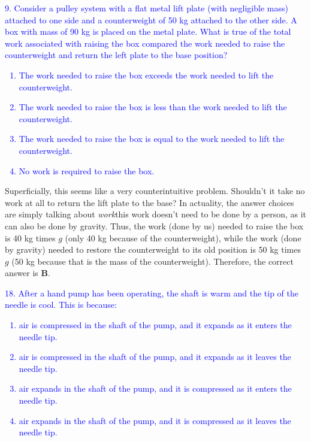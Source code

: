 \documentclass{article}
\theoremstyle{plain}%
\theoremstyle{definition}
\theoremstyle{remark}
\begin{document}
\begin{center}
\begin{minipage}{30em}
\textcolor{blue}{9. Consider a pulley system with a flat metal lift plate (with negligible mass) attached to one side and a counterweight of 50 kg attached to the other side. A box with mass of 90 kg is placed on the metal plate. What is true of the total work associated with raising the box compared the work needed to raise the counterweight and return the left plate to the base position?
\begin{enumerate}[label=\Alph*]
	\item The work needed to raise the box exceeds the work needed to lift the counterweight.
	\item The work needed to raise the box is less than the work needed to lift the counterweight.
	\item The work needed to raise the box is equal to the work needed to lift the counterweight.
	\item No work is required to raise the box.
\end{enumerate}}
\end{minipage}
\end{center}
\indent Superficially, this seems like a very counterintuitive problem. Shouldn't it take no work at all to return the lift plate to the base? In actuality, the answer choices are simply talking about \textit{work}\textemdash this work doesn't need to be done by a person, as it can also be done by gravity. Thus, the work (done by us) needed to raise the box is 40 kg times $g$ (only 40 kg because of the counterweight), while the work (done by gravity) needed to restore the counterweight to its old position is 50 kg times $g$ (50 kg because that is the mass of the counterweight). Therefore, the correct answer is \textbf{B}.
\begin{center}
\begin{minipage}{30em}
\textcolor{blue}{18. After a hand pump has been operating, the shaft is warm and the tip of the needle is cool. This is because:
\begin{enumerate}[label=\Alph*]
	\item air is compressed in the shaft of the pump, and it expands as it enters the needle tip.
	\item air is compressed in the shaft of the pump, and it expands as it leaves the needle tip.
	\item air expands in the shaft of the pump, and it is compressed as it enters the needle tip.
	\item air expands in the shaft of the pump, and it is compressed as it leaves the needle tip.
\end{enumerate}}
\end{minipage}
\end{center}
\end{document}
